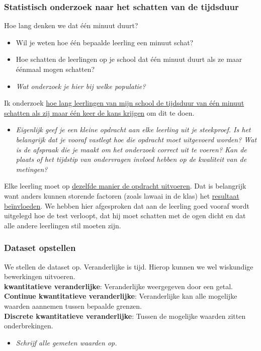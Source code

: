 \documentclass[dutch]{beamer}
\newcommand{\vraag}[1]{\begin{itemize}\item[Vraag:] {\it #1}\end{itemize}}
\begin{document}
\begin{frame}
\frametitle{Statistisch onderzoek naar het schatten van de tijdsduur}
Hoe lang denken we dat één minuut duurt?
\begin{itemize}
  \item Wil je weten hoe één bepaalde leerling een minuut schat?
  \item Hoe schatten de leerlingen op je school dat één minuut duurt als ze maar éénmaal mogen schatten?
\end{itemize}
\pause
\vraag{Wat onderzoek je hier bij welke populatie?}
\pause
Ik onderzoek \uline{hoe lang leerlingen van mijn school de tijdsduur van één minuut schatten als zij
maar één keer de kans krijgen} om dit te doen.
\pause
\vraag{Eigenlijk geef je een kleine opdracht aan elke leerling uit je steekproef. Is het belangrijk dat
je vooraf vastlegt hoe die opdracht moet uitgevoerd worden? Wat is de afspraak die je maakt
om het onderzoek correct uit te voeren? Kan de plaats of het tijdstip van ondervragen
invloed hebben op de kwaliteit van de metingen?}
\pause
Elke leerling moet op \uline{dezelfde manier de opdracht uitvoeren}. Dat is belangrijk want anders
kunnen storende factoren (zoals lawaai in de klas) het \uline{resultaat beïnvloeden}. We hebben hier
afgesproken dat aan de leerling goed vooraf wordt uitgelegd hoe de test verloopt, dat hij
moet schatten met de ogen dicht en dat alle andere leerlingen stil moeten zijn.
\end{frame}

\begin{frame}
\frametitle{Dataset opstellen}
We stellen de dataset op. Veranderlijke is tijd. Hierop kunnen we wel wiskundige bewerkingen uitvoeren.\\
\vspace*{0.5cm}
\pause
{\bf kwantitatieve veranderlijke}: Veranderlijke weergegeven door een getal.\\
{\bf Continue kwantitatieve veranderlijke}: Veranderlijke kan alle mogelijke waarden aannemen tussen bepaalde grenzen.\\
{\bf Discrete kwantitatieve veranderlijke}: Tussen de mogelijke waarden zitten onderbrekingen.\\

\pause
\vraag{Schrijf alle gemeten waarden op.}
\end{frame}
\end{document}
